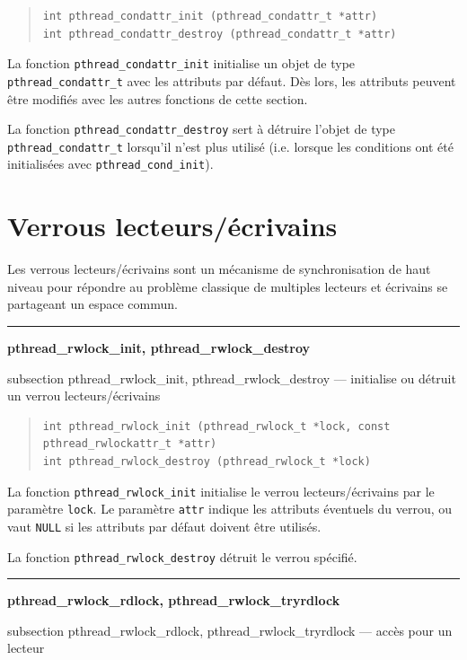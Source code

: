 \documentclass [twoside] {report}
\newcommand {\primitive} [1]
    {
	\phantomsection
	{\large \textbf {#1}}
	\addcontentsline {toc} {subsection} {#1}
    }
\newcommand {\separation}
    {
	\vspace {5mm}
	\nopagebreak
	\hrule
    }
\begin{document}
\begin {quote}
\begin {verbatim}
int pthread_condattr_init (pthread_condattr_t *attr)
int pthread_condattr_destroy (pthread_condattr_t *attr)
\end{verbatim}
\end {quote}

La fonction \verb|pthread_condattr_init| initialise un objet de type
\verb|pthread_condattr_t| avec les attributs par défaut. Dès lors,
les attributs peuvent être modifiés avec les autres fonctions de
cette section.

La fonction \verb|pthread_condattr_destroy| sert à détruire
l'objet de type \verb|pthread_condattr_t| lorsqu'il n'est plus
utilisé (i.e.  lorsque les conditions ont été initialisées avec
\verb|pthread_cond_init|).


\section {Verrous lecteurs/écrivains}

Les verrous lecteurs/écrivains sont un mécanisme de synchronisation de
haut niveau pour répondre au problème classique de multiples lecteurs
et écrivains se partageant un espace commun.

\separation
\primitive {pthread\_rwlock\_init, pthread\_rwlock\_destroy} --- initialise ou détruit un verrou lecteurs/écrivains

\begin {quote}
\begin {verbatim}
int pthread_rwlock_init (pthread_rwlock_t *lock, const pthread_rwlockattr_t *attr)
int pthread_rwlock_destroy (pthread_rwlock_t *lock)
\end{verbatim}
\end {quote}

La fonction \verb|pthread_rwlock_init| initialise le verrou
lecteurs/écrivains par le paramètre \texttt {lock}.  Le paramètre
\texttt {attr} indique les attributs éventuels du verrou, ou vaut
\texttt {NULL} si les attributs par défaut doivent être utilisés.

La fonction \verb|pthread_rwlock_destroy| détruit le verrou spécifié.


\separation
\primitive {pthread\_rwlock\_rdlock, pthread\_rwlock\_tryrdlock} --- accès pour un lecteur
\end{document}
